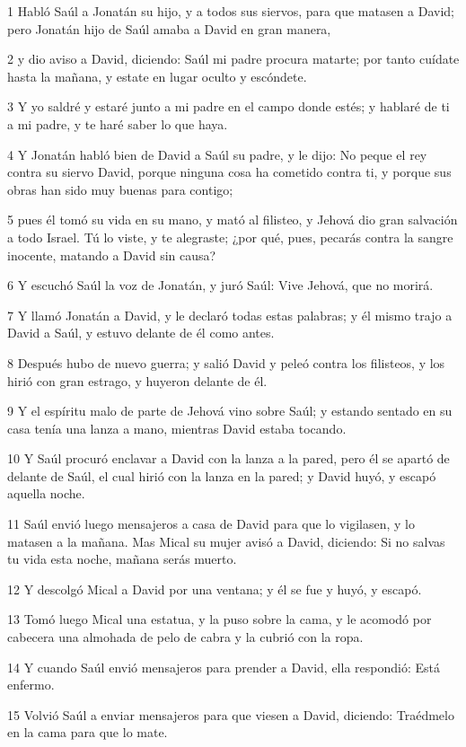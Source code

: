 \par 1 Habló Saúl a Jonatán su hijo, y a todos sus siervos, para que matasen a David; pero Jonatán hijo de Saúl amaba a David en gran manera,
\par 2 y dio aviso a David, diciendo: Saúl mi padre procura matarte; por tanto cuídate hasta la mañana, y estate en lugar oculto y escóndete.
\par 3 Y yo saldré y estaré junto a mi padre en el campo donde estés; y hablaré de ti a mi padre, y te haré saber lo que haya.
\par 4 Y Jonatán habló bien de David a Saúl su padre, y le dijo: No peque el rey contra su siervo David, porque ninguna cosa ha cometido contra ti, y porque sus obras han sido muy buenas para contigo;
\par 5 pues él tomó su vida en su mano, y mató al filisteo, y Jehová dio gran salvación a todo Israel. Tú lo viste, y te alegraste; ¿por qué, pues, pecarás contra la sangre inocente, matando a David sin causa?
\par 6 Y escuchó Saúl la voz de Jonatán, y juró Saúl: Vive Jehová, que no morirá.
\par 7 Y llamó Jonatán a David, y le declaró todas estas palabras; y él mismo trajo a David a Saúl, y estuvo delante de él como antes.
\par 8 Después hubo de nuevo guerra; y salió David y peleó contra los filisteos, y los hirió con gran estrago, y huyeron delante de él.
\par 9 Y el espíritu malo de parte de Jehová vino sobre Saúl; y estando sentado en su casa tenía una lanza a mano, mientras David estaba tocando. 
\par 10 Y Saúl procuró enclavar a David con la lanza a la pared, pero él se apartó de delante de Saúl, el cual hirió con la lanza en la pared; y David huyó, y escapó aquella noche.
\par 11 Saúl envió luego mensajeros a casa de David para que lo vigilasen, y lo matasen a la mañana. Mas Mical su mujer avisó a David, diciendo: Si no salvas tu vida esta noche, mañana serás muerto.
\par 12 Y descolgó Mical a David por una ventana; y él se fue y huyó, y escapó.
\par 13 Tomó luego Mical una estatua, y la puso sobre la cama, y le acomodó por cabecera una almohada de pelo de cabra y la cubrió con la ropa.
\par 14 Y cuando Saúl envió mensajeros para prender a David, ella respondió: Está enfermo.
\par 15 Volvió Saúl a enviar mensajeros para que viesen a David, diciendo: Traédmelo en la cama para que lo mate.

